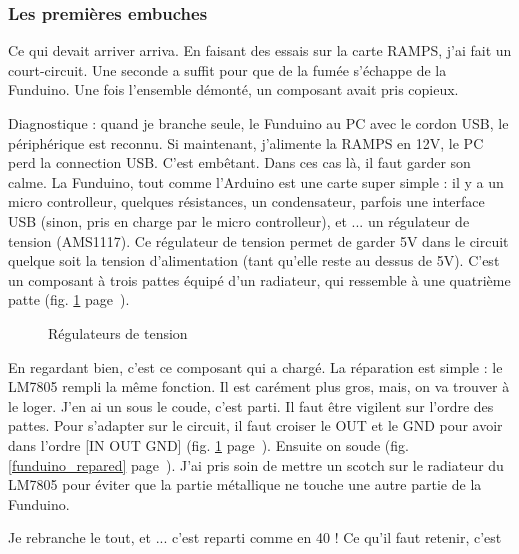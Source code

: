 \subsubsection{Les premières embuches}
Ce qui devait arriver arriva. En faisant des essais sur la carte RAMPS, j'ai fait un %
court-circuit. Une seconde a suffit pour que de la fumée s'échappe de la Funduino. Une %
fois l'ensemble démonté, un composant avait pris copieux. \par %
Diagnostique : quand je branche seule, le Funduino au PC avec le cordon USB, le %
périphérique est reconnu. Si maintenant, j'alimente la RAMPS en 12V, le PC perd la %
connection USB. C'est embêtant. Dans ces cas là, il faut garder son calme. La %
Funduino, tout comme l'Arduino est une carte super simple : il y a un micro controlleur, %
quelques résistances, un condensateur, parfois une interface USB (sinon, pris en charge %
par le micro controlleur), et ... un régulateur de tension (AMS1117). Ce régulateur de %
tension permet de garder 5V dans le circuit quelque soit la tension d'alimentation (tant %
qu'elle reste au dessus de 5V). C'est un composant à trois pattes équipé d'un radiateur, qui %
ressemble à une quatrième patte (fig. \ref{regulator} page~\pageref{regulator}). %
\begin{figure}%
   \caption{\label{regulator} Régulateurs de tension}%
\end{figure}%
En regardant bien, c'est ce composant qui a chargé. %
La réparation est simple : le LM7805 rempli la même fonction. Il est carément plus gros, %
mais, on va trouver à le loger. J'en ai un sous le coude, c'est parti. Il faut être %
vigilent sur l'ordre des pattes. Pour s'adapter sur le circuit, il faut croiser le OUT %
et le GND pour avoir dans l'ordre [IN OUT GND] (fig. \ref{regulator} page~\pageref{regulator}). Ensuite on soude (fig. \ref{funduino_repared} %
page~\pageref{funduino_repared}). J'ai pris soin de mettre un scotch sur le radiateur du %
LM7805 pour éviter que la partie métallique ne touche une autre partie de la Funduino.\par{} %
Je rebranche le tout, et ... c'est reparti comme en 40 ! Ce qu'il faut retenir, c'est %
